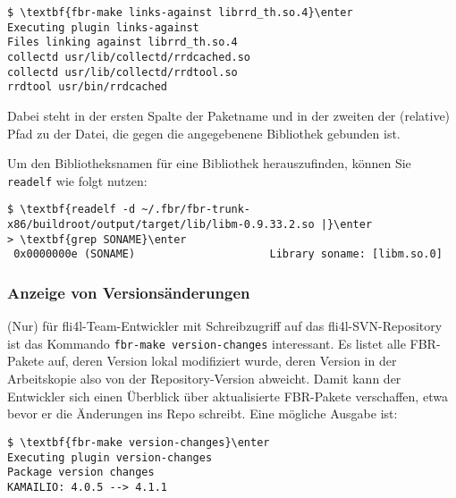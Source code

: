 \begin{example}
\begin{Verbatim}[commandchars=\\\{\}]
$ \textbf{fbr-make links-against librrd_th.so.4}\enter
Executing plugin links-against
Files linking against librrd_th.so.4
collectd usr/lib/collectd/rrdcached.so
collectd usr/lib/collectd/rrdtool.so
rrdtool usr/bin/rrdcached
\end{Verbatim}
\end{example}

Dabei steht in der ersten Spalte der Paketname und in der zweiten der (relative)
Pfad zu der Datei, die gegen die angegebenene Bibliothek gebunden ist.

Um den Bibliotheksnamen für eine Bibliothek herauszufinden, können Sie
\texttt{readelf} wie folgt nutzen:

\begin{example}
\begin{Verbatim}[commandchars=\\\{\}]
$ \textbf{readelf -d ~/.fbr/fbr-trunk-x86/buildroot/output/target/lib/libm-0.9.33.2.so |}\enter
> \textbf{grep SONAME}\enter
 0x0000000e (SONAME)                     Library soname: [libm.so.0]
\end{Verbatim}
\end{example}

\subsubsection{Anzeige von Versionsänderungen}

(Nur) für fli4l-Team-Entwickler mit Schreibzugriff auf das fli4l-SVN-Repository
ist das Kommando \texttt{fbr-make version-changes} interessant. Es listet alle
FBR-Pakete auf, deren Version lokal modifiziert wurde, deren Version in der
Arbeitskopie also von der Repository-Version abweicht. Damit kann der Entwickler
sich einen Überblick über aktualisierte FBR-Pakete verschaffen, etwa bevor er
die Änderungen ins Repo schreibt. Eine mögliche Ausgabe ist:

\begin{example}
\begin{Verbatim}[commandchars=\\\{\}]
$ \textbf{fbr-make version-changes}\enter
Executing plugin version-changes
Package version changes
KAMAILIO: 4.0.5 --> 4.1.1
\end{Verbatim}
\end{example}

